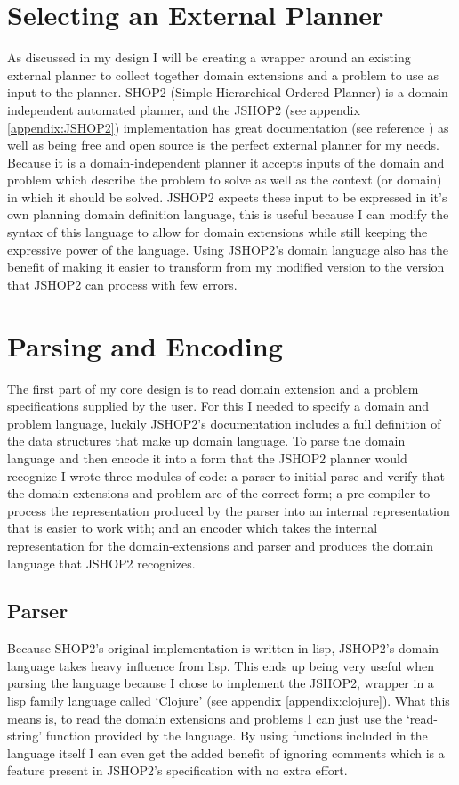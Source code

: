 \section{Selecting an External Planner}
As discussed in my design I will be creating a wrapper around an existing
external planner to collect together domain extensions and a problem to use as
input to the planner. SHOP2 (Simple Hierarchical Ordered Planner) is a
domain-independent automated planner, and the JSHOP2 (see appendix
\ref{appendix:JSHOP2}) implementation has great documentation (see reference
\cite{Ilghami2006}) as well as being free and open source is the perfect
external planner for my needs. Because it is a domain-independent planner it
accepts inputs of the domain and problem which describe the problem to solve as
well as the context (or domain) in which it should be solved. JSHOP2 expects
these input to be expressed in it's own planning domain definition language,
this is useful because I can modify the syntax of this language to allow for
domain extensions while still keeping the expressive power of the language.
Using JSHOP2's domain language also has the benefit of making it easier to
transform from my modified version to the version that JSHOP2 can process with
few errors.

\section{Parsing and Encoding}
The first part of my core design is to read domain extension and a problem
specifications supplied by the user. For this I needed to specify a domain and
problem language, luckily JSHOP2's documentation \citep{Ilghami2006} includes a
full definition of the data structures that make up domain language. To parse
the domain language and then encode it into a form that the JSHOP2 planner would
recognize I wrote three modules of code: a parser to initial parse and verify
that the domain extensions and problem are of the correct form; a pre-compiler
to process the representation produced by the parser into an internal
representation that is easier to work with; and an encoder which takes the
internal representation for the domain-extensions and parser and produces the
domain language that JSHOP2 recognizes.

\subsection{Parser}
Because SHOP2's original implementation is written in lisp, JSHOP2's domain
language takes heavy influence from lisp. This ends up being very useful when
parsing the language because I chose to implement the JSHOP2, wrapper in a lisp
family language called `Clojure' (see appendix \ref{appendix:clojure}). What
this means is, to read the domain extensions and problems I can just use the
`read-string' function provided by the language. By using functions included in
the language itself I can even get the added benefit of ignoring comments which
is a feature present in JSHOP2's specification with no extra effort.

